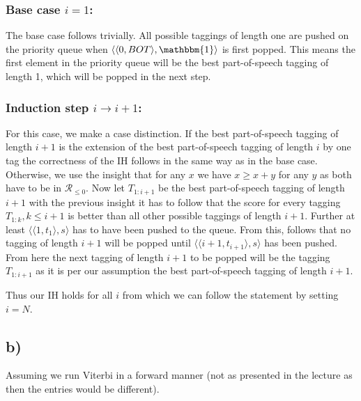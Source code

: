 \documentclass[a4paper,12pt]{ETHexercise}
\begin{document}
\subsubsection*{Base case $i=1$:}

The base case follows trivially. All possible taggings of length one are pushed on the priority queue when $\langle \langle 0, BOT \rangle, \mathbbm{1} \rangle$ is first popped. This means the first element in the priority queue will be the best part-of-speech tagging of length 1, which will be popped in the next step.

\subsubsection*{Induction step $i \rightarrow i+1$:}

For this case, we make a case distinction. If the best part-of-speech tagging of length $i+1$ is the extension of the best part-of-speech tagging of length $i$ by one tag the correctness of the IH follows in the same way as in the base case.
Otherwise, we use the insight that for any $x$ we have $x \geq x+y$ for any $y$ as both have to be in $\mathcal{R}_{\leq 0}$.
Now let $T_{1:i+1}$ be the best part-of-speech tagging of length $i+1$ with the previous insight it has to follow that the score for every tagging $T_{1:k}, k \leq i+1$ is better than all other possible taggings of length $i+1$. Further at least $\langle \langle 1, t_1 \rangle, s \rangle$ has to have been pushed to the queue. From this, follows that no tagging of length $i+1$ will be popped until $\langle \langle i+1, t_{i+1} \rangle, s \rangle$ has been pushed. From here the next tagging of length $i+1$ to be popped will be the tagging $T_{1:i+1}$ as it is per our assumption the best part-of-speech tagging of length $i+1$.

Thus our IH holds for all $i$ from which we can follow the statement by setting $i = N$.

\subsection*{b)}
Assuming we run Viterbi in a forward manner (not as presented in the lecture as then the entries would be different).
\end{document}
